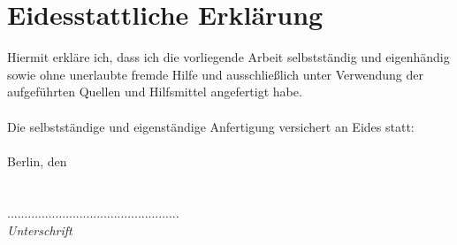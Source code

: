 \section*{Eidesstattliche Erkl\"arung} 
Hiermit erkl\"are ich, dass ich die vorliegende Arbeit selbstst\"andig und eigenh\"andig sowie ohne unerlaubte fremde
Hilfe und ausschlie{\ss}lich unter Verwendung der aufgef\"uhrten Quellen und Hilfsmittel angefertigt habe.\\\\
Die selbstst\"andige und eigenst\"andige Anfertigung versichert an Eides statt:\\\\
Berlin, den\\\\\\
..................................................\\
\textit{Unterschrift}
